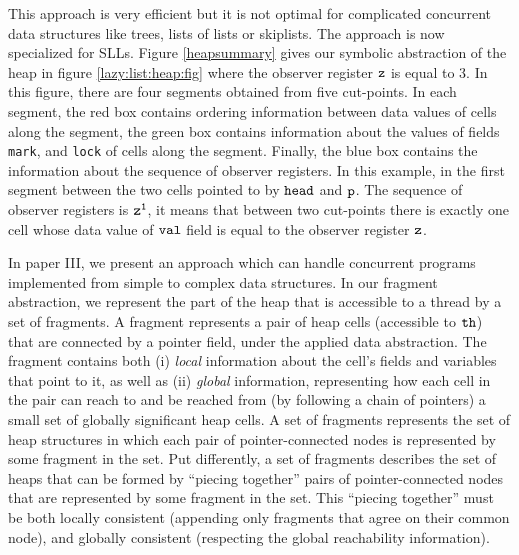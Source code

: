 This approach is very efficient but it is not optimal for complicated concurrent data structures like trees, lists of lists or skiplists. The  approach is now specialized for SLLs. Figure \ref{heapsummary} gives our symbolic abstraction of the heap in figure \ref{lazy:list:heap:fig} where the observer register $\tt z$ is equal to 3. In this figure, there are four segments obtained from five cut-points. In each segment, the red box contains ordering information between data values of cells along the segment, the green box contains information about the values of fields {\tt mark}, and {\tt lock} of cells along the segment. Finally, the blue box contains the information about the sequence of observer registers. In this example, in the first segment between the two cells pointed to by $\tt head$ and $\tt p$. The sequence of observer registers is $\tt z^1$, it means that between two cut-points there is exactly one cell whose data value of $\tt val$ field is equal to the observer register $\tt z$.

In paper III, we present an approach which can handle concurrent programs implemented from simple to complex data structures.  In our fragment abstraction,
 we represent the part of the heap that is accessible to a thread by a set of fragments. A fragment represents a pair of heap cells (accessible to ${\tt th}$)
that are connected by a pointer field, under the applied data abstraction. The fragment contains both
(i) {\em local} information about the cell's fields and variables that
  point to it, as well as
(ii) {\em global} information, representing how
  each cell in the pair can reach to and be reached from
  (by following a chain of pointers) a small set of globally significant
  heap cells.
 A set of fragments represents the set of heap
structures in which each pair of pointer-connected nodes is represented by some
fragment in the set.
Put differently, a set of fragments describes the set of heaps that can be formed by
``piecing together'' pairs of pointer-connected nodes that are represented
by some fragment in the set. This ``piecing together'' must
be both locally consistent (appending only fragments that agree on their
common node), and globally consistent (respecting the global reachability
information).
%

